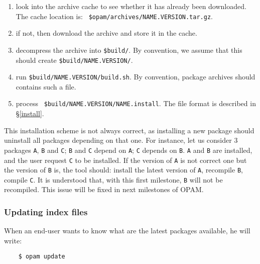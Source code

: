 \documentclass[a4paper,11pt]{article}
\newenvironment{remark}[1][Remark]{\begin{trivlist}
\item[\hskip \labelsep {\bfseries #1}]}{\end{trivlist}}
\begin{document}
\begin{itemize}
\begin{enumerate}
\begin{enumerate}
\begin{enumerate}

\item look into the archive cache to see whether it has already been
  downloaded. The cache location is: {\tt
    \$opam/archives/NAME.VERSION.tar.gz}.

\item if not, then download the archive and store it in the cache.

\item decompress the archive into {\tt \$build/}. By convention, we
  assume that this should create {\tt \$build/NAME.VERSION/}.

\item run {\tt \$build/NAME.VERSION/build.sh}. By convention, package
  archives should contains such a file.

\item process {\tt
  \$build/NAME.VERSION/NAME.install}\label{NAME.install}.  The file
  format is described in \S\ref{install}.

\end{enumerate}
\end{enumerate}
\end{enumerate}

\begin{remark}
This installation scheme is not always correct, as installing a new
package should uninstall all packages depending on that one. For
instance, let us consider 3 packages {\tt A}, {\tt B} and {\tt C};
{\tt B} and {\tt C} depend on {\tt A}; {\tt C} depends on {\tt B}.
{\tt A} and {\tt B} are installed, and the user request {\tt C} to be
installed. If the version of {\tt A} is not correct one but the
version of {\tt B} is, the tool should: install the latest version of
{\tt A}, recompile {\tt B}, compile {\tt C}. It is understood that,
with this first milestone, {\tt B} will not be recompiled. This issue
will be fixed in next milestones of OPAM.
\end{remark}

\subsubsection{Updating index files}

When an end-user wants to know what are the latest packages available,
he will write:

\begin{verbatim}
    $ opam update
\end{verbatim}


\end{itemize}
\end{document}
